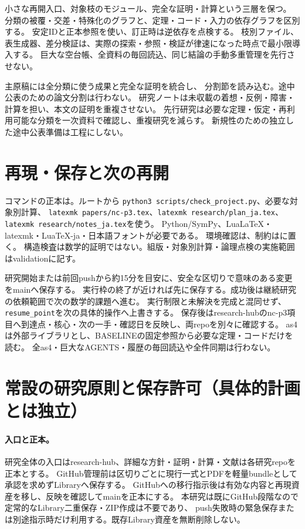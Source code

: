 \documentclass[11pt,a4paper]{ltjsarticle}
\begin{document}
小さな再開入口、対象枝のモジュール、完全な証明・計算という三層を保つ。
分類の被覆・交差・特殊化のグラフと、定理・コード・入力の依存グラフを区別する。
安定IDと正本参照を使い、訂正時は逆依存を点検する。
枝別ファイル、表生成器、差分検証は、実際の探索・参照・検証が律速になった時点で最小限導入する。
巨大な空台帳、全資料の毎回読込、同じ結論の手動多重管理を先行させない。

主原稿には全分類に使う成果と完全な証明を統合し、
分割節を読み込む。途中公表のための論文分割は行わない。
研究ノートは未収載の着想・反例・障害・計算を担い、本文の証明を重複させない。
先行研究は必要な定理・仮定・再利用可能な分類を一次資料で確認し、重複研究を減らす。
新規性のための独立した途中公表準備は工程にしない。

\section{再現・保存と次の再開}
コマンドの正本は。ルートから
\texttt{python3 scripts/check\_project.py}、必要な対象別計算、
\texttt{latexmk papers/nc-p3.tex}、\texttt{latexmk research/plan\_ja.tex}、
\texttt{latexmk research/notes\_ja.tex}を使う。
Python/SymPy、LuaLaTeX・latexmk・LuaTeX-ja・日本語フォントが必要である。
環境確認は、制約はに置く。
構造検査は数学的証明ではない。組版・対象別計算・論理点検の実施範囲はvalidationに記す。

研究開始または前回pushから約15分を目安に、安全な区切りで意味のある変更をmainへ保存する。
実行枠の終了が近ければ先に保存する。成功後は継続研究の依頼範囲で次の数学的課題へ進む。
実行制限と未解決を完成と混同せず、\texttt{resume\_point}を次の具体的操作へ上書きする。
保存後はresearch-hubのnc-p3項目へ到達点・核心・次の一手・確認日を反映し、両repoを別々に確認する。
as4は外部ライブラリとし、BASELINEの固定参照から必要な定理・コードだけを読む。
全as4・巨大なAGENTS・履歴の毎回読込や全件同期は行わない。

\section{常設の研究原則と保存許可（具体的計画とは独立）}
\paragraph{入口と正本。}
研究全体の入口はresearch-hub、詳細な方針・証明・計算・文献は各研究repoを正本とする。
GitHub管理前は区切りごとに現行一式とPDFを軽量bundleとして承認を求めずLibraryへ保存する。
GitHubへの移行指示後は有効な内容と再現資産を移し、反映を確認してmainを正本にする。
本研究は既にGitHub段階なので定常的なLibrary二重保存・ZIP作成は不要であり、
push失敗時の緊急保存または別途指示時だけ利用する。既存Library資産を無断削除しない。
\end{document}
